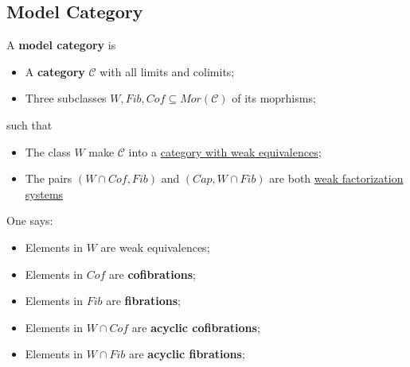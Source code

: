 \documentclass[Total.tex]{subfiles}
\begin{document}
			\subsection{Model Category}
			\begin{Def}
				A \textbf{model category} is
				\begin{itemize}
					\item A \textbf{category} $\mathcal{C}$ with all limits and colimits;
					\item Three subclasses $W,Fib,Cof\subseteq Mor(\mathcal{C})$ of its moprhisms;
				\end{itemize}
				such that
				\begin{itemize}
					\item The class $W$ make $\mathcal{C}$ into a \underline{category with weak equivalences};
					\item The pairs $(W\cap Cof,Fib)$ and $(Cap,W\cap Fib)$ are both \underline{weak factorization systems}
				\end{itemize}
				One says:
				\begin{itemize}
					\item Elements in $W$ are weak equivalences;
					\item Elements in $Cof$ are \textbf{cofibrations};
					\item Elements in $Fib$ are \textbf{fibrations};
					\item Elements in $W\cap Cof$ are \textbf{acyclic cofibrations};
					\item Elements in $W\cap Fib$ are \textbf{acyclic fibrations};
				\end{itemize}
			\end{Def}
\end{document}
